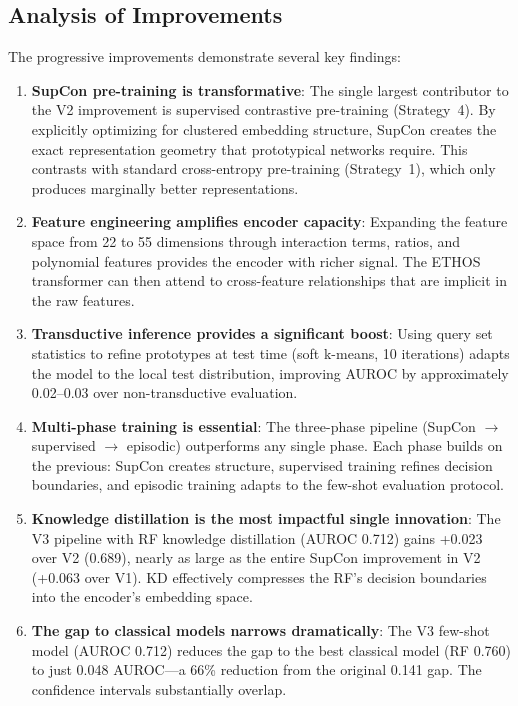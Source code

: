 \subsection{Analysis of Improvements}

The progressive improvements demonstrate several key findings:

\begin{enumerate}
\item \textbf{SupCon pre-training is transformative}: The single largest contributor to the V2 improvement is supervised contrastive pre-training (Strategy~4). By explicitly optimizing for clustered embedding structure, SupCon creates the exact representation geometry that prototypical networks require. This contrasts with standard cross-entropy pre-training (Strategy~1), which only produces marginally better representations.

\item \textbf{Feature engineering amplifies encoder capacity}: Expanding the feature space from 22 to 55 dimensions through interaction terms, ratios, and polynomial features provides the encoder with richer signal. The ETHOS transformer can then attend to cross-feature relationships that are implicit in the raw features.

\item \textbf{Transductive inference provides a significant boost}: Using query set statistics to refine prototypes at test time (soft k-means, 10 iterations) adapts the model to the local test distribution, improving AUROC by approximately 0.02--0.03 over non-transductive evaluation.

\item \textbf{Multi-phase training is essential}: The three-phase pipeline (SupCon $\to$ supervised $\to$ episodic) outperforms any single phase. Each phase builds on the previous: SupCon creates structure, supervised training refines decision boundaries, and episodic training adapts to the few-shot evaluation protocol.

\item \textbf{Knowledge distillation is the most impactful single innovation}: The V3 pipeline with RF knowledge distillation (AUROC 0.712) gains +0.023 over V2 (0.689), nearly as large as the entire SupCon improvement in V2 (+0.063 over V1). KD effectively compresses the RF's decision boundaries into the encoder's embedding space.

\item \textbf{The gap to classical models narrows dramatically}: The V3 few-shot model (AUROC 0.712) reduces the gap to the best classical model (RF 0.760) to just 0.048 AUROC---a 66\% reduction from the original 0.141 gap. The confidence intervals substantially overlap.


\end{enumerate}
